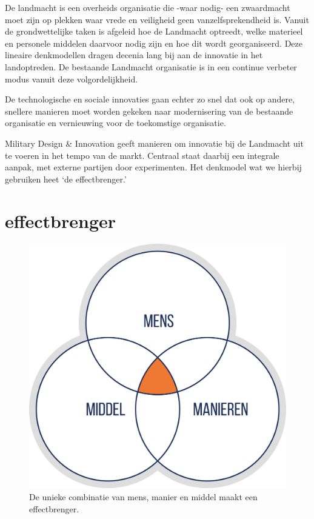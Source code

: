\documentclass[
]{book}
\begin{document}
De landmacht is een overheids organisatie die -waar nodig- een zwaardmacht moet zijn op plekken waar vrede en veiligheid geen vanzelfsprekendheid is. Vanuit de grondwettelijke taken is afgeleid hoe de Landmacht optreedt, welke materieel en personele middelen daarvoor nodig zijn en hoe dit wordt georganiseerd. Deze lineaire denkmodellen dragen decenia lang bij aan de innovatie in het landoptreden. De bestaande Landmacht organisatie is in een continue verbeter modus vanuit deze volgordelijkheid.

De technologische en sociale innovaties gaan echter zo snel dat ook op andere, snellere manieren moet worden gekeken naar modernisering van de bestaande organisatie en vernieuwing voor de toekomstige organisatie.

Military Design \& Innovation geeft manieren om innovatie bij de Landmacht uit te voeren in het tempo van de markt. Centraal staat daarbij een integrale aanpak, met externe partijen door experimenten. Het denkmodel wat we hierbij gebruiken heet `de effectbrenger.'

\hypertarget{effectbrenger}{%
\section{effectbrenger}\label{effectbrenger}}

\begin{figure}
\includegraphics[width=350pt]{data/images/20210324-MDI-mmm-model} \caption{De unieke combinatie van mens, manier en middel maakt een effectbrenger.}\label{fig:mmm-model}
\end{figure}
\end{document}
